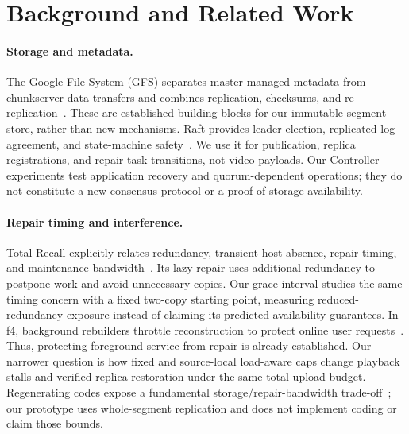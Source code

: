 \section{Background and Related Work}
\label{sec:related-work}

\paragraph{Storage and metadata.}
The Google File System (GFS) separates master-managed metadata from
chunkserver data transfers and combines replication, checksums, and
re-replication~\cite{ghemawat2003gfs}. These are established building blocks
for our immutable segment store, rather than new mechanisms. Raft provides
leader election, replicated-log agreement, and state-machine
safety~\cite{ongaro2014raft}. We use it for publication, replica registrations,
and repair-task transitions, not video payloads. Our Controller experiments
test application recovery and quorum-dependent operations; they do not
constitute a new consensus protocol or a proof of storage availability.

\paragraph{Repair timing and interference.}
Total Recall explicitly relates redundancy, transient host absence, repair
timing, and maintenance bandwidth~\cite{bhagwan2004totalrecall}. Its lazy
repair uses additional redundancy to postpone work and avoid unnecessary
copies. Our grace interval studies the same timing concern with a fixed
two-copy starting point, measuring reduced-redundancy exposure instead of
claiming its predicted availability guarantees. In f4, background rebuilders
throttle reconstruction to protect online user
requests~\cite{muralidhar2014f4}. Thus, protecting foreground service from
repair is already established. Our narrower question is how fixed and
source-local load-aware caps change playback stalls and verified replica
restoration under the same total upload budget. Regenerating codes expose a
fundamental storage/repair-bandwidth trade-off~\cite{dimakis2008network};
our prototype uses whole-segment replication and does not implement coding
or claim those bounds.


